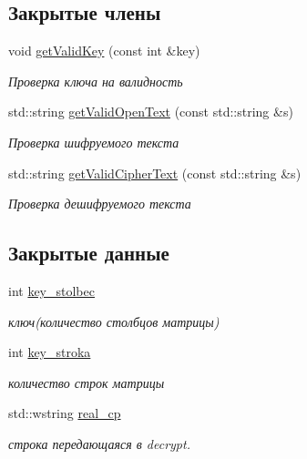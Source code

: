 \subsection*{Закрытые члены}
\begin{DoxyCompactItemize}
\item 
void \hyperlink{classSwapCipher_a7b86880b1a197343bcf65a395c2d3d2e}{get\+Valid\+Key} (const int \&key)
\begin{DoxyCompactList}\small\item\em Проверка ключа на валидность \end{DoxyCompactList}\item 
std\+::string \hyperlink{classSwapCipher_aeee71718a56980b964abc32cda498a98}{get\+Valid\+Open\+Text} (const std\+::string \&s)
\begin{DoxyCompactList}\small\item\em Проверка шифруемого текста \end{DoxyCompactList}\item 
std\+::string \hyperlink{classSwapCipher_a243f5c096f4cd4b0f4d4b7993fb082d6}{get\+Valid\+Cipher\+Text} (const std\+::string \&s)
\begin{DoxyCompactList}\small\item\em Проверка дешифруемого текста \end{DoxyCompactList}\end{DoxyCompactItemize}
\subsection*{Закрытые данные}
\begin{DoxyCompactItemize}
\item 
\mbox{\label{classSwapCipher_a2f19bca4df89af5479700ed57a976bb2}} 
int \hyperlink{classSwapCipher_a2f19bca4df89af5479700ed57a976bb2}{key\+\_\+stolbec}
\begin{DoxyCompactList}\small\item\em ключ(количество столбцов матрицы) \end{DoxyCompactList}\item 
\mbox{\label{classSwapCipher_afdbad1d138089f2e2e6bcf40dc53e18f}} 
int \hyperlink{classSwapCipher_afdbad1d138089f2e2e6bcf40dc53e18f}{key\+\_\+stroka}
\begin{DoxyCompactList}\small\item\em количество строк матрицы \end{DoxyCompactList}\item 
\mbox{\label{classSwapCipher_a784b1cc877aac8c85a4586c2e46f5906}} 
std\+::wstring \hyperlink{classSwapCipher_a784b1cc877aac8c85a4586c2e46f5906}{real\+\_\+cp}
\begin{DoxyCompactList}\small\item\em строка передающаяся в decrypt. \end{DoxyCompactList}\end{DoxyCompactItemize}


